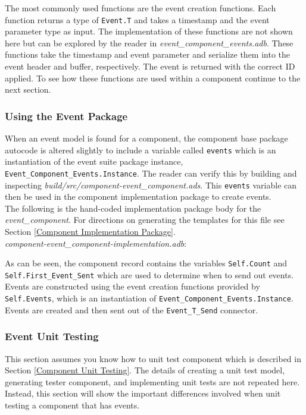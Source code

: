 The most commonly used functions are the event creation functions. Each function returns a type of \texttt{Event.T} and takes a timestamp and the event parameter type as input. The implementation of these functions are not shown here but can be explored by the reader in \textit{event\_component\_events.adb}. These functions take the timestamp and event parameter and serialize them into the event header and buffer, respectively. The event is returned with the correct ID applied. To see how these functions are used within a component continue to the next section.

\subsubsection{Using the Event Package}

When an event model is found for a component, the component base package autocode is altered slightly to include a variable called \texttt{events} which is an instantiation of the event suite package instance, \texttt{Event\_Component\_Events.Instance}. The reader can verify this by building and inspecting \textit{build/src/component-event\_component.ads}. This \texttt{events} variable can then be used in the component implementation package to create events. \\

The following is the hand-coded implementation package body for the \textit{event\_component}. For directions on generating the templates for this file see Section \ref{Component Implementation Package}. \\

\textit{component-event\_component-implementation.adb}:

As can be seen, the component record contains the variables \texttt{Self.Count} and \texttt{Self.First\_Event\_Sent} which are used to determine when to send out events. Events are constructed using the event creation functions provided by \texttt{Self.Events}, which is an instantiation of \texttt{Event\_Component\_Events.Instance}. Events are created and then sent out of the \texttt{Event\_T\_Send} connector.

\subsubsection{Event Unit Testing}

This section assumes you know how to unit test component which is described in Section \ref{Component Unit Testing}. The details of creating a unit test model, generating tester component, and implementing unit tests are not repeated here. Instead, this section will show the important differences involved when unit testing a component that has events. \\

